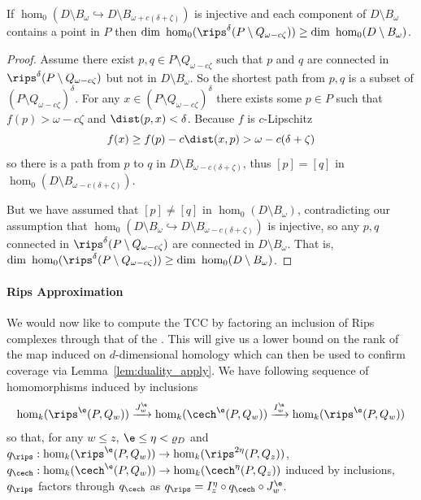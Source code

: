\begin{lemma}\label{lem:assumption2}
  If $\hom_0(D\setminus B_\omega\hookrightarrow D\setminus B_{\omega+c(\delta+\zeta)})$ is injective and each component of $D\setminus B_\omega$ contains a point in $P$ then $\dim~\hom_0(\rips^\delta(P\setminus Q_{\omega-c\zeta})) \geq \dim~\hom_0(D\setminus B_\omega)$.
\end{lemma}
\begin{proof}
  Assume there exist $p,q \in P\setminus Q_{\omega-c\zeta}$ such that $p$ and $q$ are connected in $\rips^\delta(P\setminus Q_{\omega-c\zeta})$ but not in $D\setminus B_\omega$.
  So the shortest path from $p, q$ is a subset of $(P\setminus Q_{\omega-c\zeta})^\delta$.
  For any $x\in (P\setminus Q_{\omega-c\zeta})^\delta$ there exists some $p\in P$ such that $f(p) > \omega - c\zeta$ and $\dist(p,x) < \delta$.
  Because $f$ is $c$-Lipschitz
  \[ f(x)\geq f(p) - c\dist(x,p) > \omega - c(\delta+\zeta)\]
  so there is a path from $p$ to $q$ in $D\setminus B_{\omega-c(\delta+\zeta)}$, thus $[p] = [q]$ in $\hom_0(D\setminus B_{\omega-c(\delta+\zeta)})$.

  But we have assumed that $[p]\neq[q]$ in $\hom_0(D\setminus B_\omega)$, contradicting our assumption that $\hom_0(D\setminus B_\omega\hookrightarrow D\setminus B_{\omega-c(\delta+\zeta)})$ is injective, so any $p,q$ connected in $\rips^\delta(P\setminus Q_{\omega-c\zeta})$ are connected in $D\setminus B_\omega$.
  That is, $\dim~\hom_0(\rips^\delta(P\setminus Q_{\omega-c\zeta}))\geq \dim~\hom_0(D\setminus B_\omega)$.
\end{proof}

\paragraph{Rips Approximation}

We would now like to compute the TCC by factoring an inclusion of Rips complexes through that of the \Cech.
This will give us a lower bound on the rank of the map induced on $d$-dimensional homology which can then be used to confirm coverage via Lemma~\ref{lem:duality_apply}.
We have following sequence of homomorphisms induced by inclusions
\[ \hom_k(\rips^\e(P, Q_w))\xrightarrow{J_w^\e}\hom_k(\cech^\e(P, Q_w))\xrightarrow{I_w^\e}\hom_k(\rips^\e(P, Q_w))\]
so that, for any $w\leq z$, $\e\leq\eta < \varrho_D$ and $q_{\rips} : \hom_k(\rips^\e(P, Q_w))\to \hom_k(\rips^{2\eta}(P, Q_z))$, $q_{\cech} : \hom_k(\cech^\e(P, Q_w))\to \hom_k(\cech^{\eta}(P, Q_z))$ induced by inclusions, $q_{\rips}$ factors through $q_{\cech}$ as $q_{\rips} = I_z^\eta\circ q_{\cech}\circ J_w^\e$.

